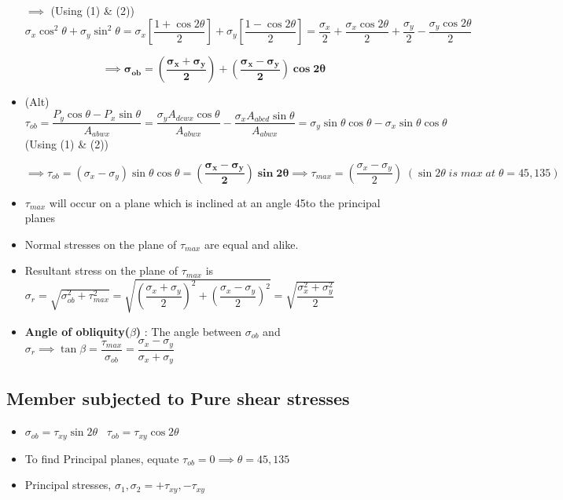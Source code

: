 \documentclass[8pt]{report}
\begin{document}
\begin{itemize}
			\item[$\implies$] (Using (1) \& (2)) $\sigma_x\cos^2\theta + \sigma_y\sin^2\theta = \sigma_x\left[\dfrac{1+\cos 2\theta}{2}\right] + \sigma_y\left[\dfrac{1-\cos 2\theta}{2}\right] = \dfrac{\sigma_x}{2}+\dfrac{\sigma_x\cos 2\theta}{2}+\dfrac{\sigma_y}{2}-\dfrac{\sigma_y\cos 2\theta}{2}$ 
			\item[] $$\implies \boxed{\pmb{\sigma_{ob} = \left(\dfrac{\sigma_x+\sigma_y}{2}\right)+\left(\dfrac{\sigma_x-\sigma_y}{2}\right)\cos 2\theta}}$$
			\item (Alt)$\tau_{ob} = \dfrac{P_y\cos\theta-P_x\sin\theta}{A_{abwx}} = \dfrac{\sigma_yA_{dcwx}\cos\theta}{A_{abwx}}-\dfrac{\sigma_xA_{abcd}\sin\theta}{A_{abwx}} = \sigma_y\sin\theta\cos\theta - \sigma_x\sin\theta\cos\theta$ (Using (1) \& (2))
			\item[] $$\implies \boxed{\tau_{ob} = (\sigma_x-\sigma_y)\sin\theta\cos\theta = \pmb{\left(\dfrac{\sigma_x-\sigma_y}{2}\right)\sin 2\theta}\implies \boxed{\tau_{max} = \left(\dfrac{\sigma_x-\sigma_y}{2}\right)}\;(\sin 2\theta\;is\;max\;at\;\theta=45,135)}$$
			\item $\tau_{max}$ will occur on a plane which is inclined at an angle 45\textdegree to the principal planes
			\item Normal stresses on the plane of $\tau_{max}$ are equal and alike. 
			\item Resultant stress on the plane of $\tau_{max}$ is $\sigma_r = \sqrt{\sigma_{ob}^2+\tau_{max}^2} = \sqrt{\left(\dfrac{\sigma_x+\sigma_y}{2}\right)^2+\left(\dfrac{\sigma_x-\sigma_y}{2}\right)^2} = \sqrt{\dfrac{\sigma_x^2+\sigma_y^2}{2}}$
			\item \textbf{Angle of obliquity($\beta$)} : The angle between $\sigma_{ob}$ and $\sigma_r \implies \boxed{\tan\beta=\dfrac{\tau_{max}}{\sigma_{ob}} = \dfrac{\sigma_x-\sigma_y}{\sigma_x+\sigma_y}}$
		\end{itemize}
	\subsection{Member subjected to Pure shear stresses}
		\begin{itemize}
			\item $\boxed{\sigma_{ob} = \tau_{xy}\sin 2\theta}\;\;\;\boxed{\tau_{ob} = \tau_{xy}\cos 2\theta}$
			\item To find Principal planes, equate $\tau_{ob}=0 \implies \theta=45,135$
			\item Principal stresses, $\boxed{\sigma_1,\sigma_2 = +\tau_{xy},-\tau_{xy}}$
		\end{itemize}\hrulefill
\end{document}
